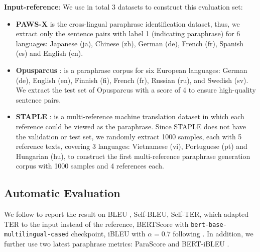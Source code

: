\documentclass[letterpaper]{article} %
\begin{document}
\textbf{Input-reference}: We use in total 3 datasets to construct this evaluation set:
\begin{itemize}
    \item \textbf{PAWS-X} \citep{yang-etal-2019-paws} is the cross-lingual paraphrase identification dataset, thus, we extract only the sentence pairs with label 1 (indicating paraphrase) for 6 languages: Japanese (ja), Chinese (zh), German (de), French (fr), Spanish (es) and English (en).

    \item \textbf{Opusparcus} \citep{Creutz2019}: is a paraphrase corpus for six European languages: German (de), English (en), Finnish (fi), French (fr), Russian (ru), and Swedish (sv).  We extract the test set of Opusparcus with a score of 4 to ensure high-quality sentence pairs.

    \item \textbf{STAPLE} \citep{DVN/38OJR6_2020}: is a multi-reference machine translation dataset in which each reference could be viewed as the paraphrase. Since STAPLE does not have the validation or test set, we randomly extract 1000 samples, each with 5 reference texts, covering 3 languages: Vietnamese (vi), Portuguese (pt) and Hungarian (hu), to construct the first multi-reference paraphrase generation corpus with 1000 samples and 4 references each.
\end{itemize}

\subsection{Automatic Evaluation}
We follow \citet{Chowdhury_Zhuang_Wang_2022} to report the result on BLEU \citep{papineni-etal-2002-bleu}, Self-BLEU, Self-TER, which adapted TER \citep{snover-etal-2006-study} to the input instead of the reference, BERTScore \citep{zhang-etal-2020-bertscore} with \texttt{bert-base-multilingual-cased} checkpoint, iBLEU with $\alpha = 0.7$ following \citet{hosking-lapata-2021-factorising}. In addition, we further use two latest paraphrase metrics: ParaScore \citep{shen-etal-2022-evaluation} and BERT-iBLEU \citep{niu-etal-2021-unsupervised}.

\end{document}
